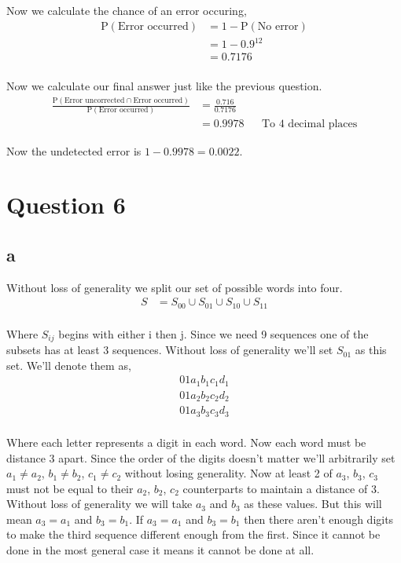 \documentclass{article}
\begin{document}
Now we calculate the chance of an error occuring,
\begin{align*}
    \text{P}(\text{Error occurred}) &= 1 - \text{P}(\text{No error}) \\
    &= 1 - 0.9^{12} \\
    &= 0.7176 \\
\end{align*}

Now we calculate our final answer just like the previous question.
\begin{align*}
    \frac{\text{P}(\text{Error uncorrected} \cap \text{Error occurred})}
    {\text{P}(\text{Error occurred})}
    &= \frac{0.716}{0.7176} \\
    &= 0.9978 && \text{To 4 decimal places}
\end{align*}

Now the undetected error is $1 - 0.9978 = 0.0022$.

\section{Question 6}
\subsection{a}
Without loss of generality we split our set of possible words into four.
\begin{align*}
    S &= S_{00} \cup S_{01} \cup S_{10} \cup S_{11} \\
\end{align*}

Where $S_{ij}$ begins with either i then j. Since we need 9 sequences one of
the subsets has at least 3 sequences. Without loss of generality we'll set
$S_{01}$ as this set. We'll denote them as,
\begin{align*}
    0 1 a_1 b_1 c_1 d_1 \\
    0 1 a_2 b_2 c_2 d_2 \\
    0 1 a_3 b_3 c_3 d_3 \\
\end{align*}

Where each letter represents a digit in each word. Now each word must be
distance 3 apart. Since the order of the digits doesn't matter we'll
arbitrarily set $a_1 \neq a_2$, $b_1 \neq b_2$, $c_1 \neq c_2$ without losing
generality. Now at least 2 of $a_3$, $b_3$, $c_3$ must not be equal to their
$a_2$, $b_2$, $c_2$ counterparts to maintain a distance of 3. Without loss of
generality we will take $a_3$ and $b_3$ as these values. But this will mean
$a_3 = a_1$ and $b_3 = b_1$. If $a_3 = a_1$ and $b_3 = b_1$ then there aren't
enough digits to make the third sequence different enough from the first.
Since it cannot be done in the most general case it means it cannot be done
at all.
\end{document}
